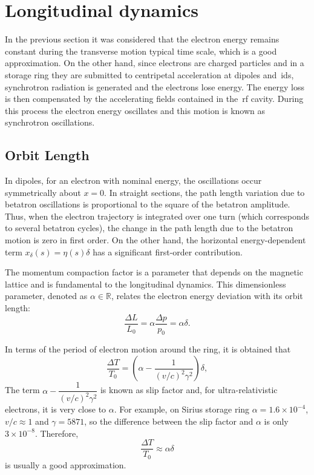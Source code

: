 \section{Longitudinal dynamics}\label{longitudinal}
In the previous section it was considered that the electron energy remains constant during the transverse motion typical time scale, which is a good approximation. On the other hand, since electrons are charged particles and in a storage ring they are submitted to centripetal acceleration at dipoles and~\gls{id}s, synchrotron radiation is generated and the electrons lose energy. The energy loss is then compensated by the accelerating fields contained in the~\gls{rf} cavity. During this process the electron energy oscillates and this motion is known as synchrotron oscillations.
\subsection{Orbit Length}
In dipoles, for an electron with nominal energy, the oscillations occur symmetrically about $x=0$. In straight sections, the path length variation due to betatron oscillations is proportional to the square of the betatron amplitude. Thus, when the electron trajectory is integrated over one turn (which corresponds to several betatron cycles), the change in the path length due to the betatron motion is zero in first order. On the other hand, the horizontal energy-dependent term $x_{\delta}(s) = \eta(s) \delta$ has a significant first-order contribution. 

The momentum compaction factor is a parameter that depends on the magnetic lattice and is fundamental to the longitudinal dynamics. This dimensionless parameter, denoted as $\alpha \in \mathbb{R}$, relates the electron energy deviation with its orbit length:
\begin{equation}
    \frac{\Delta L}{L_0} = \alpha \dfrac{\Delta p}{p_0} = \alpha \delta.
    \label{orbitlen}
\end{equation}

In terms of the period of electron motion around the ring, it is obtained that
\begin{equation}
    \frac{\Delta T}{T_0} = \left(\alpha - \dfrac{1}{(v/c)^2\gamma^2}\right) \delta,
    \label{slip}
\end{equation}
The term $\alpha - \dfrac{1}{(v/c)^2\gamma^2}$ is known as slip factor and, for ultra-relativistic electrons, it is very close to $\alpha$. For example, on Sirius storage ring $\alpha = 1.6 \times 10^{-4}$, $v/c \approx 1$ and $\gamma = 5871$, so the difference between the slip factor and $\alpha$ is only $3 \times 10^{-8}$. Therefore, 
\begin{equation}
    \frac{\Delta T}{T_0} \approx \alpha \delta
    \label{eq:period_change}
\end{equation}
is usually a good approximation. 

